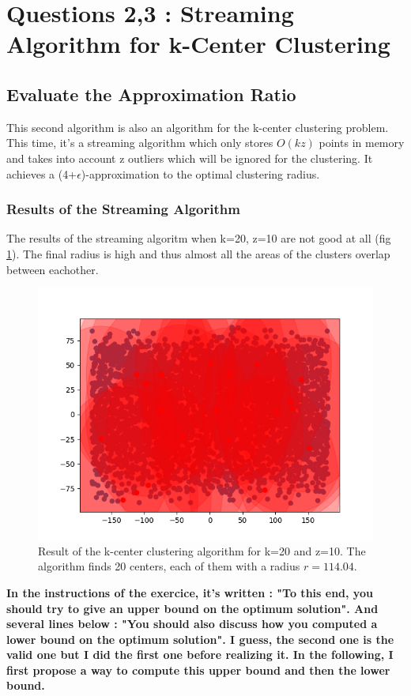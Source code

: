 \documentclass[a4paper,11pt,openany]{article}
\begin{document}
\section*{Questions 2,3 : Streaming Algorithm for k-Center Clustering}
\subsection*{Evaluate the Approximation Ratio}
\label{z_10}
\noindent
This second algorithm \cite{streaming} is also an algorithm for the k-center clustering problem. This time, it's a streaming algorithm which only stores $O(kz)$ points in memory and takes into account z outliers which will be ignored for the clustering. It achieves a (4+$\epsilon$)-approximation to the optimal clustering radius.\\
\subsubsection*{Results of the Streaming Algorithm}
\noindent
The results of the streaming algoritm when k=20, z=10 are not good at all (fig \ref{fig:sa_z_10}). The final radius is high and thus almost all the areas of the clusters overlap between eachother.
\begin{figure}[H]
\begin{center}
\includegraphics[scale=0.7]{Images/sa_z_10}
\caption{Result of the k-center clustering algorithm for k=20 and z=10. The algorithm finds 20 centers, each of them with a radius $r=114.04$.}
\label{fig:sa_z_10}
\end{center}
\end{figure}
\noindent
\textbf{In the instructions of the exercice, it's written : "To this end, you should try to give an upper bound on the optimum solution". And several lines below : "You should also discuss how you computed a lower bound on the optimum solution". I guess, the second one is the valid one but I did the first one before realizing it. In the following, I first propose a way to compute this upper bound and then the lower bound.}
\end{document}
